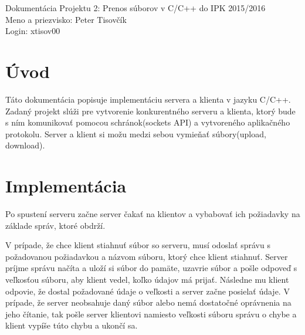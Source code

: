 \documentclass[10pt,a4paper,final]{article}
\begin{document}

  \pagestyle{plain}
  \setcounter{page}{1}
  
  \setlength{\parindent}{1cm}
  \setlength{\parskip}{0.2cm plus4mm minus3mm}
  
  \noindent
  Dokumentácia Projektu 2: Prenos súborov v C/C++ do IPK 2015/2016 \\
  Meno a priezvisko: Peter Tisovčík \\
  Login: xtisov00 \\
  


  \section{Úvod} \label{uvod}

Táto dokumentácia popisuje implementáciu servera a klienta v jazyku C/C++. Zadaný projekt slúži pre vytvorenie konkurentného serveru a klienta, ktorý bude s ním komunikovať pomocou schránok(sockets API) a vytvoreného aplikačného protokolu. Server a klient si možu medzi sebou vymieňať súbory(upload, download). 

  \section{Implementácia} \label{implementacia}

Po spustení serveru začne server čakať na klientov a vybabovať ich požiadavky na základe správ, ktoré obdrží. 

V prípade, že chce klient stiahnuť súbor so serveru,
musí odoslať správu s požadovanou požiadavkou a názvom súboru,
ktorý chce klient stiahnuť. Server príjme správu načíta a uloží
si súbor do pamäte, uzavrie súbor a pošle odpoveď s veľkosťou
súboru, aby klient vedel, koľko údajov má prijať. Následne mu klient
odpovie, že dostal požadované údaje o veľkosti a server začne posielať údaje.
V prípade, že server neobsahuje daný súbor alebo nemá dostatočné
oprávnenia na jeho čítanie, tak pošle server klientovi namiesto veľkosti
súboru správu o chybe a klient vypíše túto chybu a ukončí sa.
\end{document}
